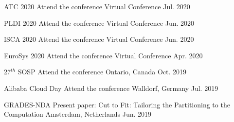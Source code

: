 
\begin{cvhonors}
  \cvhonor
    {ATC 2020} %
    {Attend the conference} %
    {Virtual Conference} %
    {Jul. 2020} %

  \cvhonor
    {PLDI 2020} %
    {Attend the conference} %
    {Virtual Conference} %
    {Jun. 2020} %

  \cvhonor
    {ISCA 2020} %
    {Attend the conference} %
    {Virtual Conference} %
    {Jun. 2020} %

  \cvhonor
    {EuroSys 2020} %
    {Attend the conference} %
    {Virtual Conference} %
    {Apr. 2020} %

  \cvhonor
    {27$^{th}$ SOSP} %
    {Attend the conference} %
    {Ontario, Canada} %
    {Oct. 2019} %

  \cvhonor
    {Alibaba Cloud Day} %
    {Attend the conference} %
    {Walldorf, Germany} %
    {Jul. 2019} %

  \cvhonor
    {GRADES-NDA} %
    {Present paper: Cut to Fit: Tailoring the Partitioning to the
    Computation} %
    {Amsterdam, Netherlands} %
    {Jun. 2019} %


\end{cvhonors}
